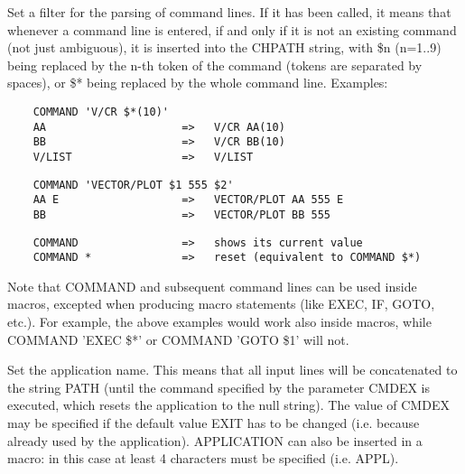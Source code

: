    \par
Set a filter for the parsing of command lines.  If it has been called, it 
   means that whenever a command line is entered, if and only if it is not an 
   existing command (not just ambiguous), it is inserted into the CHPATH 
   string, with \$n (n=1..9) being replaced by the n-th token of the command 
   (tokens are separated by spaces), or \$* being replaced by the whole 
   command line. Examples:  
\begin{verbatim}
    COMMAND 'V/CR $*(10)'
    AA                     =>   V/CR AA(10)
    BB                     =>   V/CR BB(10)
    V/LIST                 =>   V/LIST
\end{verbatim}
\begin{verbatim}
    COMMAND 'VECTOR/PLOT $1 555 $2'
    AA E                   =>   VECTOR/PLOT AA 555 E
    BB                     =>   VECTOR/PLOT BB 555
\end{verbatim}
\begin{verbatim}
    COMMAND                =>   shows its current value
    COMMAND *              =>   reset (equivalent to COMMAND $*)
\end{verbatim}
   \par
Note that COMMAND and subsequent command lines can be used inside macros, 
   excepted when producing macro statements (like EXEC, IF, GOTO, etc.).  For 
   example, the above examples would work also inside macros, while COMMAND 
   'EXEC \$*' or COMMAND 'GOTO \$1' will not.  

\ENDCMD


\BEGARG
{}
\ENDARG

   \par
Set the application name.  This means that all input lines will be 
   concatenated to the string PATH (until the command specified by the 
   parameter CMDEX is executed, which resets the application to the null 
   string). The value of CMDEX may be specified if the default value EXIT has 
   to be changed (i.e. because already used by the application).  APPLICATION 
   can also be inserted in a macro: in this case at least 4 characters must be 
   specified (i.e. APPL).  

\ENDCMD


\BEGARG
{}
\ENDARG


